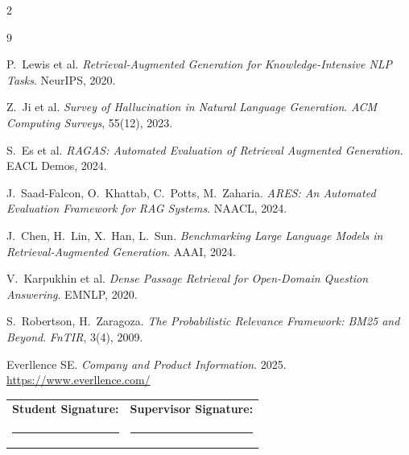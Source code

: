 \documentclass[10pt,a4paper]{article}
\begin{document}
{\footnotesize
\renewcommand{\refname}{}\vspace{-3.2em}
\begin{multicols}{2}
\raggedright
\begin{thebibliography}{9}\itemsep0pt

P.\ Lewis et al.
\textit{Retrieval-Augmented Generation for Knowledge-Intensive NLP Tasks}. NeurIPS, 2020.

Z.\ Ji et al.
\textit{Survey of Hallucination in Natural Language Generation}. \textit{ACM Computing Surveys}, 55(12), 2023.

S.\ Es et al.
\textit{RAGAS: Automated Evaluation of Retrieval Augmented Generation}. EACL Demos, 2024.

J.\ Saad-Falcon, O.\ Khattab, C.\ Potts, M.\ Zaharia.
\textit{ARES: An Automated Evaluation Framework for RAG Systems}. NAACL, 2024.

J.\ Chen, H.\ Lin, X.\ Han, L.\ Sun.
\textit{Benchmarking Large Language Models in Retrieval-Augmented Generation}. AAAI, 2024.

V.\ Karpukhin et al.
\textit{Dense Passage Retrieval for Open-Domain Question Answering}. EMNLP, 2020.

S.\ Robertson, H.\ Zaragoza.
\textit{The Probabilistic Relevance Framework: BM25 and Beyond}. \textit{FnTIR}, 3(4), 2009.

Everllence SE. \textit{Company and Product Information}. 2025. \url{https://www.everllence.com/}

\end{thebibliography}
\end{multicols}}

\vspace{0.4em}
\noindent
{\small
\begin{tabularx}{\textwidth}{X X}
\textbf{Student Signature:} & \textbf{Supervisor Signature:} \\[1.4em]
\rule{0.42\textwidth}{0.4pt} & \rule{0.42\textwidth}{0.4pt} \\
\end{tabularx}}
\end{document}
